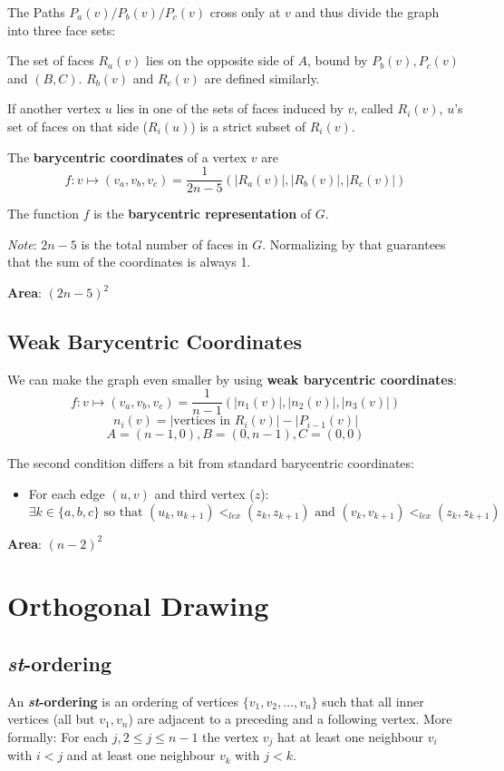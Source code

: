 \documentclass[10pt,a4paper]{article}
\begin{document}
The Paths $P_a(v) / P_b(v) / P_c(v)$ cross only at $v$ and thus divide the
graph into three face sets:

The set of faces $R_a(v)$ lies on the opposite side of $A$, bound by $P_b(v),
P_c(v)$ and $(B, C)$.
$R_b(v)$ and $R_c(v)$ are defined similarly.

If another vertex $u$ lies in one of the sets of faces induced by $v$, called
$R_i(v)$, $u$'s set of faces on that side ($R_i(u)$) is a strict subset of
$R_i(v)$.

The \textbf{barycentric coordinates} of a vertex $v$ are
$$ f: v \mapsto (v_a, v_b, v_c) = \frac{1}{2n-5} (|R_a(v)|,|R_b(v)|,|R_c(v)|) $$

The function $f$ is the \textbf{barycentric representation} of $G$.

\textit{Note}: $2n-5$ is the total number of faces in $G$.
Normalizing by that guarantees that the sum of the coordinates is always 1.

\textbf{Area}: $(2n-5)^2$

\subsection{Weak Barycentric Coordinates}

We can make the graph even smaller by using \textbf{weak barycentric
coordinates}:
$$ f: v \mapsto (v_a, v_b, v_c) = \frac{1}{n-1} (|n_1(v)|,|n_2(v)|,|n_3(v)|) $$
$$ n_i(v) = |\text{vertices in }R_i(v)| - |P_{i-1}(v)| $$
$$ A = (n-1, 0), B = (0, n-1), C = (0,0) $$

The second condition differs a bit from standard barycentric coordinates:

\begin{itemize}
    \item For each edge $(u, v)$ and third vertex ($z$):
        $$ \exists k \in \{a, b, c\} \text{ so that }
        (u_k, u_{k+1}) <_{lex} (z_k, z_{k+1}) \text{ and }
        (v_k, v_{k+1}) <_{lex} (z_k, z_{k+1}) $$
\end{itemize}

\textbf{Area}: $(n-2)^2$

\section{Orthogonal Drawing}

\subsection{\textit{st}-ordering}
An \textbf{\textit{st}-ordering} is an ordering of vertices $\{v_1, v_2, \dots,
v_n\}$ such that all inner vertices (all but $v_1, v_n$) are adjacent to a
preceding and a following vertex.
More formally: For each $j, 2 \leq j \leq n-1$ the vertex $v_j$ hat at least
one neighbour $v_i$ with $i < j$ and at least one neighbour $v_k$ with $j < k$.
\end{document}

